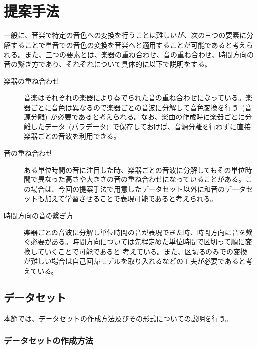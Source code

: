 \chapter{提案手法}

一般に、音楽で特定の音色への変換を行うことは難しいが、次の三つの要素に分解することで単音での音色の変換を音楽へと適用することが可能であると考えられる。また、三つの要素とは、楽器の重ね合わせ、音の重ね合わせ、時間方向の音の繋ぎ方であり、それぞれについて具体的に以下で説明をする。

\begin{description}

\item[楽器の重ね合わせ]\mbox{}

音楽はそれぞれの楽器により奏でられた音の重ね合わせになっている。楽器ごとに音色は異なるので楽器ごとの音波に分解して音色変換を行う~(音源分離)~が必要であると考えられる。なお、楽曲の作成時に楽器ごとに分離したデータ~(パラデータ)~で保存しておけば、音源分離を行わずに直接楽器ごとの音波を利用できる。

\item[音の重ね合わせ]\mbox{}

ある単位時間の音に注目した時、楽器ごとの音波に分解してもその単位時間で異なった高さや大きさの音の重ね合わせになっていることがある。この場合は、今回の提案手法で用意したデータセット以外に和音のデータセットも加えて学習させることで表現可能であると考えられる。

\item[時間方向の音の繋ぎ方]\mbox{}


楽器ごとの音波に分解し単位時間の音が表現できた時、時間方向に音を繋ぐ必要がある。時間方向については先程定めた単位時間で区切って順に変換していくことで可能であると 考えている。また、区切るのみでの変換が難しい場合は自己回帰モデルを取り入れるなどの工夫が必要であると考えている。

\end{description}


\section{データセット}

本節では、データセットの作成方法及びその形式についての説明を行う。

\subsection{データセットの作成方法}

